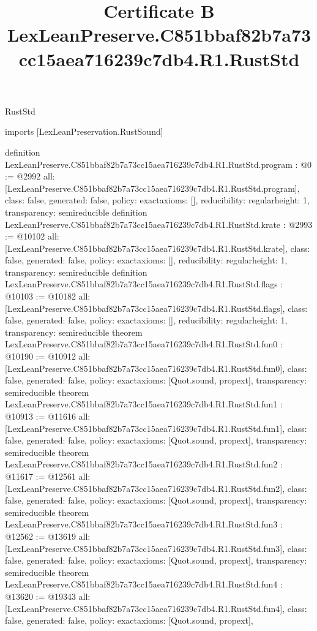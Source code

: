 \begin{lexlean}{RustStd}
\title{Certificate B LexLeanPreserve.C851bbaf82b7a73cc15aea716239c7db4.R1.RustStd}
\begin{coremodule}
imports [LexLeanPreservation.RustSound]

definition LexLeanPreserve.C851bbaf82b7a73cc15aea716239c7db4.R1.RustStd.program : @0 := @2992 {
  all: [LexLeanPreserve.C851bbaf82b7a73cc15aea716239c7db4.R1.RustStd.program],
  class: false,
  generated: false,
  policy: exact{axioms: []},
  reducibility: regular{height: 1},
  transparency: semireducible
}
definition LexLeanPreserve.C851bbaf82b7a73cc15aea716239c7db4.R1.RustStd.krate : @2993 := @10102 {
  all: [LexLeanPreserve.C851bbaf82b7a73cc15aea716239c7db4.R1.RustStd.krate],
  class: false,
  generated: false,
  policy: exact{axioms: []},
  reducibility: regular{height: 1},
  transparency: semireducible
}
definition LexLeanPreserve.C851bbaf82b7a73cc15aea716239c7db4.R1.RustStd.flags : @10103 := @10182 {
  all: [LexLeanPreserve.C851bbaf82b7a73cc15aea716239c7db4.R1.RustStd.flags],
  class: false,
  generated: false,
  policy: exact{axioms: []},
  reducibility: regular{height: 1},
  transparency: semireducible
}
theorem LexLeanPreserve.C851bbaf82b7a73cc15aea716239c7db4.R1.RustStd.fun0 : @10190 := @10912 {
  all: [LexLeanPreserve.C851bbaf82b7a73cc15aea716239c7db4.R1.RustStd.fun0],
  class: false,
  generated: false,
  policy: exact{axioms: [Quot.sound, propext]},
  transparency: semireducible
}
theorem LexLeanPreserve.C851bbaf82b7a73cc15aea716239c7db4.R1.RustStd.fun1 : @10913 := @11616 {
  all: [LexLeanPreserve.C851bbaf82b7a73cc15aea716239c7db4.R1.RustStd.fun1],
  class: false,
  generated: false,
  policy: exact{axioms: [Quot.sound, propext]},
  transparency: semireducible
}
theorem LexLeanPreserve.C851bbaf82b7a73cc15aea716239c7db4.R1.RustStd.fun2 : @11617 := @12561 {
  all: [LexLeanPreserve.C851bbaf82b7a73cc15aea716239c7db4.R1.RustStd.fun2],
  class: false,
  generated: false,
  policy: exact{axioms: [Quot.sound, propext]},
  transparency: semireducible
}
theorem LexLeanPreserve.C851bbaf82b7a73cc15aea716239c7db4.R1.RustStd.fun3 : @12562 := @13619 {
  all: [LexLeanPreserve.C851bbaf82b7a73cc15aea716239c7db4.R1.RustStd.fun3],
  class: false,
  generated: false,
  policy: exact{axioms: [Quot.sound, propext]},
  transparency: semireducible
}
theorem LexLeanPreserve.C851bbaf82b7a73cc15aea716239c7db4.R1.RustStd.fun4 : @13620 := @19343 {
  all: [LexLeanPreserve.C851bbaf82b7a73cc15aea716239c7db4.R1.RustStd.fun4],
  class: false,
  generated: false,
  policy: exact{axioms: [Quot.sound, propext]},
}
\end{coremodule}
\end{lexlean}
